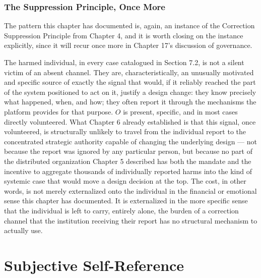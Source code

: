 \documentclass[12pt,a4paper]{book}
\begin{document}
\section{The Suppression Principle, Once More}

The pattern this chapter has documented is, again, an instance of the Correction Suppression Principle from Chapter 4, and it is worth closing on the instance explicitly, since it will recur once more in Chapter 17's discussion of governance.

The harmed individual, in every case catalogued in Section 7.2, is not a silent victim of an absent channel. They are, characteristically, an unusually motivated and specific source of exactly the signal that would, if it reliably reached the part of the system positioned to act on it, justify a design change: they know precisely what happened, when, and how; they often report it through the mechanisms the platform provides for that purpose. $O$ is present, specific, and in most cases directly volunteered. What Chapter 6 already established is that this signal, once volunteered, is structurally unlikely to travel from the individual report to the concentrated strategic authority capable of changing the underlying design — not because the report was ignored by any particular person, but because no part of the distributed organization Chapter 5 described has both the mandate and the incentive to aggregate thousands of individually reported harms into the kind of systemic case that would move a design decision at the top. The cost, in other words, is not merely externalized onto the individual in the financial or emotional sense this chapter has documented. It is externalized in the more specific sense that the individual is left to carry, entirely alone, the burden of a correction channel that the institution receiving their report has no structural mechanism to actually use.



\part{Subjective Self-Reference}

\setcounter{chapter}{8}
\end{document}
